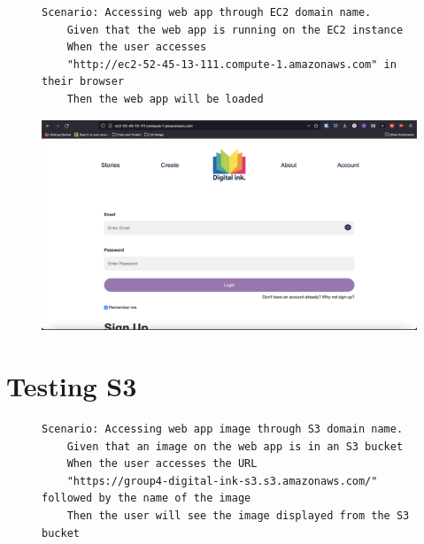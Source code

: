 \clearpage

\begin{figure}[!htbp]
    \centering
    \begin{verbatim}
Scenario: Accessing web app through EC2 domain name.
    Given that the web app is running on the EC2 instance
    When the user accesses
    "http://ec2-52-45-13-111.compute-1.amazonaws.com" in their browser
    Then the web app will be loaded
    \end{verbatim}
    \label{fig:accessing-web-app-ec2}
\end{figure}

\begin{figure}[!htbp]
    \centering
    \includegraphics[width=\textwidth]{resources/ec2/digital-ink-ec2}
    \label{fig:ec2-test-digital-ink}
\end{figure}

\clearpage

\section{Testing S3}\label{sec:testing-s3}

\begin{figure}[!htbp]
    \centering
    \begin{verbatim}
Scenario: Accessing web app image through S3 domain name.
    Given that an image on the web app is in an S3 bucket
    When the user accesses the URL
    "https://group4-digital-ink-s3.s3.amazonaws.com/" followed by the name of the image
    Then the user will see the image displayed from the S3 bucket
    \end{verbatim}
    \label{fig:accessing-image-s3}
\end{figure}

